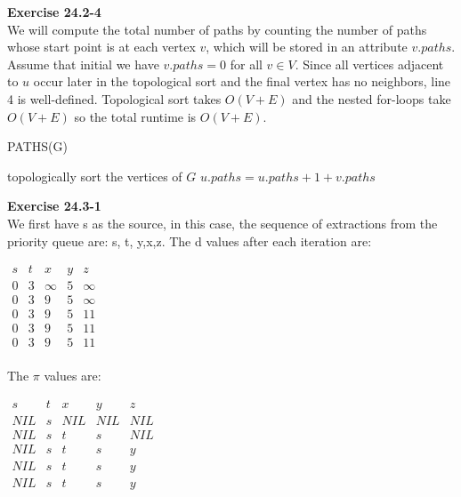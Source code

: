 \documentclass{article}
\begin{document}
\noindent\textbf{Exercise 24.2-4}\\

We will compute the total number of paths by counting the number of paths whose start point is at each vertex $v$, which will be stored in an attribute $v.paths$.  Assume that initial we have $v.paths = 0$ for all $v \in V$.  Since all vertices adjacent to $u$ occur later in the topological sort and the final vertex has no neighbors, line 4 is well-defined. Topological sort takes $O(V+E)$ and the nested for-loops take $O(V+E)$ so the total runtime is $O(V+E)$.  \\

\begin{algorithm}
\caption{PATHS(G)}
\begin{algorithmic}[1]
\State topologically sort the vertices of $G$
		\State $u.paths = u.paths + 1 + v.paths$
	\EndFor
\EndFor
\end{algorithmic}
\end{algorithm}

\noindent\textbf{Exercise 24.3-1}\\

We first have s as the source, in this case, the sequence of extractions from the priority queue are: s, t, y,x,z. The d values after each iteration are:

\begin{center}
$
\begin{array}{|c|c|c|c|c|c|}
s&t&x&y&z\\
\hline
0&3&\infty&5&\infty\\
0&3&9&5&\infty\\
0&3&9&5&11\\
0&3&9&5&11\\
0&3&9&5&11\\
\end{array}
$
\end{center}


The $\pi$ values are:

\begin{center}
$
\begin{array}{|c|c|c|c|c|c|}
s&t&x&y&z\\
\hline
NIL&s&NIL&NIL&NIL\\
NIL&s&t&s&NIL\\
NIL&s&t&s&y\\
NIL&s&t&s&y\\
NIL&s&t&s&y\\
\end{array}
$
\end{center}
\end{document}
